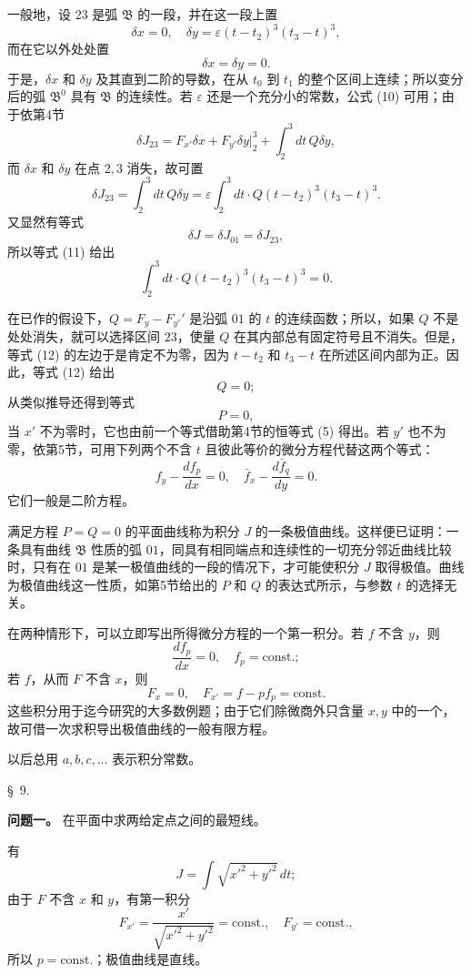 \documentclass[11pt,a4paper,leqno]{article}
\begin{document}
一般地，设 $23$ 是弧 $\mathfrak{B}$ 的一段，并在这一段上置
\[
\delta x=0,\quad \delta y=\varepsilon(t-t_2)^3(t_3-t)^3,
\]
而在它以外处处置
\[
\delta x=\delta y=0.
\]
于是，$\delta x$ 和 $\delta y$ 及其直到二阶的导数，在从 $t_0$ 到 $t_1$ 的整个区间上连续；所以变分后的弧 $\mathfrak{B}^0$ 具有 $\mathfrak{B}$ 的连续性。若 $\varepsilon$ 还是一个充分小的常数，公式 (10) 可用；由于依第4节
\[
\delta J_{23}=F_{x'}\delta x+F_{y'}\delta y\bigg|_2^3+\int_2^3 dt\,Q\delta y,
\]
而 $\delta x$ 和 $\delta y$ 在点 $2,3$ 消失，故可置
\[
\delta J_{23}=\int_2^3 dt\,Q\delta y=\varepsilon\int_2^3 dt\cdot Q(t-t_2)^3(t_3-t)^3.
\]
又显然有等式
\[
\delta J=\delta J_{01}=\delta J_{23},
\]
所以等式 (11) 给出
\begin{equation}\tag{12}
\int_2^3 dt\cdot Q(t-t_2)^3(t_3-t)^3=0.
\end{equation}

在已作的假设下，$Q=F_y-F_{y'}'$ 是沿弧 $01$ 的 $t$ 的连续函数；所以，如果 $Q$ 不是处处消失，就可以选择区间 $23$，使量 $Q$ 在其内部总有固定符号且不消失。但是，等式 (12) 的左边于是肯定不为零，因为 $t-t_2$ 和 $t_3-t$ 在所述区间内部为正。因此，等式 (12) 给出
\[
Q=0;
\]
从类似推导还得到等式
\[
P=0,
\]
当 $x'$ 不为零时，它也由前一个等式借助第4节的恒等式 (5) 得出。若 $y'$ 也不为零，依第5节，可用下列两个不含 $t$ 且彼此等价的微分方程代替这两个等式：
\[
f_y-\frac{df_p}{dx}=0,\quad \bar f_x-\frac{d\bar f_q}{dy}=0.
\]
它们一般是二阶方程。

满足方程 $P=Q=0$ 的平面曲线称为积分 $J$ 的一条极值曲线。这样便已证明：一条具有曲线 $\mathfrak{B}$ 性质的弧 $01$，同具有相同端点和连续性的一切充分邻近曲线比较时，只有在 $01$ 是某一极值曲线的一段的情况下，才可能使积分 $J$ 取得极值。曲线为极值曲线这一性质，如第5节给出的 $P$ 和 $Q$ 的表达式所示，与参数 $t$ 的选择无关。

在两种情形下，可以立即写出所得微分方程的一个第一积分。若 $f$ 不含 $y$，则
\[
\frac{df_p}{dx}=0,\quad f_p=\mathrm{const.};
\]
若 $f$，从而 $F$ 不含 $x$，则
\[
F_x=0,\quad F_{x'}=f-pf_p=\mathrm{const.}
\]
这些积分用于迄今研究的大多数例题；由于它们除微商外只含量 $x,y$ 中的一个，故可借一次求积导出极值曲线的一般有限方程。

以后总用 $a,b,c,\ldots$ 表示积分常数。

\begin{center}{\large \S~9.}\end{center}

\noindent\textbf{问题一。} 在平面中求两给定点之间的最短线。

有
\[
J=\int \sqrt{x'^2+y'^2}\,dt;
\]
由于 $F$ 不含 $x$ 和 $y$，有第一积分
\[
F_{x'}=\frac{x'}{\sqrt{x'^2+y'^2}}=\mathrm{const.},\quad F_{y'}=\mathrm{const.},
\]
所以 $p=\mathrm{const.}$；极值曲线是直线。
\end{document}
